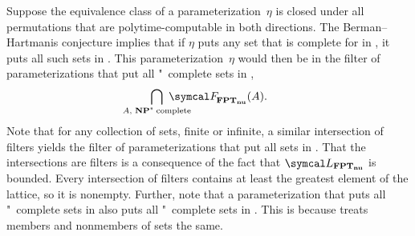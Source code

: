 Suppose the equivalence class of a parameterization~$\eta$ is closed under all permutations that are polytime-computable in both directions.
The Berman--Hartmanis conjecture implies that if $\eta$ puts any set that is complete for  in , it puts all such sets in .
This parameterization~$\eta$ would then be in the filter of parameterizations that put all "~complete sets in ,
\begin{equation*}
  \bigcap_{\mathclap{A\text{, \cl{NP}"~complete}}}\ \calF_\clnu{FPT}(A).
\end{equation*}
Note that for any collection of sets, finite or infinite, a similar intersection of filters yields the filter of parameterizations that put all sets in .
That the intersections are filters is a consequence of the fact that $\calL_\clnu{FPT}$ is bounded.
Every intersection of filters contains at least the greatest element of the lattice, so it is nonempty.
Further, note that a parameterization that puts all "~complete sets in  also puts all "~complete sets in .
This is because  treats members and nonmembers of sets the same.

